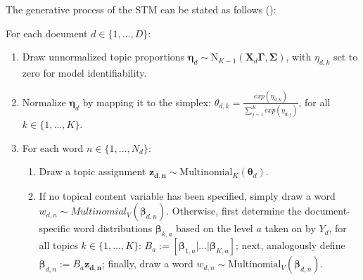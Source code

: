 \noindent
The generative process of the STM can be stated as follows (\citealp{roberts2016model}):

\vspace{0.25cm}
\noindent
For each document $d \in \{1,\dots,D\}$:

\begin{enumerate}[{1)}]
\vspace{-0.25cm}
\item Draw unnormalized topic proportions $\boldsymbol{\eta}_d \sim \text{N}_{K-1}(\boldsymbol{X}_d\boldsymbol{\Gamma}, \boldsymbol{\Sigma})$, with $\eta_{d,k}$ set to zero for model identifiability.
\vspace{-0.25cm}
\item Normalize $\boldsymbol{\eta}_d$ by mapping it to the simplex: $\theta_{d,k} = \frac{exp(\eta_{d,k})}{\sum_{j=1}^{K}exp(\eta_{d,j})}$, for all $k \in \{1,\dots,K\}$.
\vspace{-0.25cm}
\item For each word $n \in \{1,\dots,N_d\}$:
	\begin{enumerate}[{a)}]
	\vspace{-0.25cm}    
    \item Draw a topic assignment $\boldsymbol{z_{d,n}} \sim \text{Multinomial}_K(\boldsymbol{\theta}_d)$.
	\vspace{-0.25cm}    
    \item If no topical content variable has been specified, simply draw a word $w_{d,n} \sim Multinomial_V(\boldsymbol{\beta}_{d,n})$. Otherwise, first determine the document-specific word distributions $\boldsymbol{\beta}_{k,a}$ based on the level $a$ taken on by $Y_d$, for all topics $k \in \{1,\dots,K\}$: $B_a := [\boldsymbol{\beta}_{1,a}|\dots|\boldsymbol{\beta}_{K,a}]$; next, analogously define $\boldsymbol{\beta}_{d,n}:=B_a\boldsymbol{z_{d,n}}$; finally, draw a word $w_{d,n} \sim \text{Multinomial}_V(\boldsymbol{\beta}_{d,n})$.
	\end{enumerate}
\end{enumerate}

